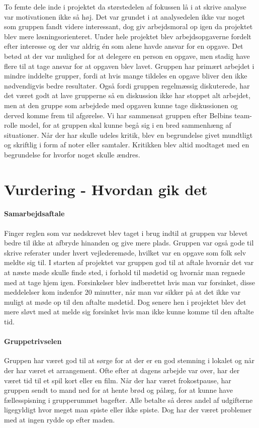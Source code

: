 To femte dele inde i projektet da størstedelen af fokussen lå i at skrive analyse var motivationen ikke så høj. Det var grundet i at analysedelen ikke var noget som gruppen fandt videre interessant, dog giv arbejdsmoral op igen da projektet blev mere løsningsorienteret. Under hele projektet blev arbejdsopgaverne fordelt efter interesse og der var aldrig én som alene havde ansvar for en opgave. Det betød at der var mulighed for at delegere en person en opgave, men stadig have flere til at tage ansvar for at opgaven blev lavet.
Gruppen har primært arbejdet i mindre inddelte grupper, fordi at hvis mange tildeles en opgave bliver den ikke nødvendigvis bedre resultater. Også fordi gruppen regelmæssig diskuterede, har det været godt at lave grupperne så en diskussion ikke har stoppet alt arbejdet, men at den gruppe som arbejdede med opgaven kunne tage diskussionen og derved komme frem til afgørelse. Vi har sammensat gruppen efter Belbins team-rolle model, for at gruppen skal kunne begå sig i en bred sammenhæng af situationer. Når der har skulle udeles kritik, blev en begrundelse givet mundtligt og skriftlig i form af noter eller samtaler. Kritikken blev altid modtaget med en begrundelse for hvorfor noget skulle ændres.

\section{Vurdering - Hvordan gik det}
\paragraph{Samarbejdsaftale}
Finger reglen som var nedskrevet blev taget i brug indtil at gruppen var blevet bedre til ikke at afbryde hinanden og give mere plads. Gruppen var også gode til skrive referater under hvert vejlederemøde, hvilket var en opgave som folk selv meldte sig til. I starten af projektet var gruppen god til at aftale hvornår det var at næste møde skulle finde sted, i forhold til mødetid og hvornår man regnede med at tage hjem igen. Forsinkelser blev indberettet hvis man var forsinket, disse meddelelser kom indenfor 20 minutter, når man var sikker på at det ikke var muligt at møde op til den aftalte mødetid. Dog senere hen i projektet blev det mere sløvt med at melde sig forsinket hvis man ikke kunne komme til den aftalte tid.

\paragraph{Gruppetrivselen}
Gruppen har været god til at sørge for at der er en god stemning i lokalet og når der har været et arrangement. Ofte efter at dagens arbejde var over, har der været tid til et spil kort eller en film. Når der har været frokostpause, har gruppen sendt to mand ned for at hente brød og pålæg, for at kunne have fællesspisning i grupperummet bagefter. Alle betalte så deres andel af udgifterne ligegyldigt hvor meget man spiste eller ikke spiste. Dog har der været problemer med at ingen rydde op efter maden.

